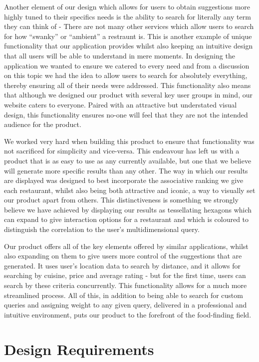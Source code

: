 \documentclass[10pt,a4paper]{article}
\begin{document}
Another element of our design which allows for users to obtain suggestions more highly tuned to their specifics needs is the ability to search for literally any term they can think of - There are not many other services which allow users to search for how “swanky” or “ambient” a restraunt is. This is another example of unique functionality that our application provides whilst also keeping an intuitive design that all users will be able to understand in mere moments. In designing the application we wanted to ensure we catered to every need and from a discussion on this topic we had the idea to allow users to search for absolutely everything, thereby ensuring all of their needs were addressed. This functionality also means that although we designed our product with several key user groups in mind, our website caters to everyone. Paired with an attractive but understated visual design, this functionality ensures no-one will feel that they are not the intended audience for the product.

We worked very hard when building this product to ensure that functionality was not sacrificed for simplicity and vice-versa. This endeavour has left us with a product that is as easy to use as any currently available, but one that we believe will generate more specific results than any other. The way in which our results are displayed was designed to best incorporate the associative ranking we give each restaurant, whilst also being both attractive and iconic, a way to visually set our product apart from others. This distinctiveness is something we strongly believe we have achieved by displaying our results as tessellating hexagons which can expand to give interaction options for a restaurant and which is coloured to distinguish the correlation to the user’s multidimensional query.

Our product offers all of the key elements offered by similar applications, whilst also expanding on them to give users more control of the suggestions that are generated. It uses user’s location data to search by distance, and it allows for searching by cuisine, price and average rating - but for the first time, users can search by these criteria concurrently. This functionality allows for a much more streamlined process. All of this, in addition to being able to search for custom queries and assigning weight to any given query, delivered in a professional and intuitive environment, puts our product to the forefront of the food-finding field. 

\section*{Design Requirements}
\end{document}
